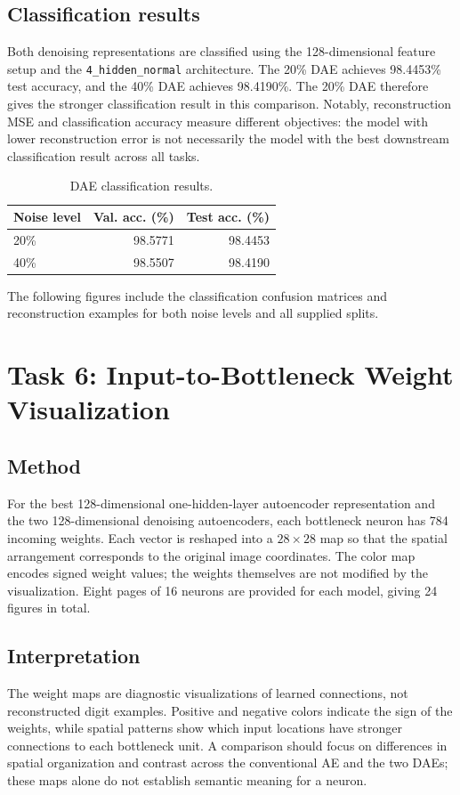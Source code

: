 \documentclass[conference,onecolumn]{IEEEtran}
\begin{document}
\subsection{Classification results}
Both denoising representations are classified using the 128-dimensional feature setup and the \texttt{4\_hidden\_normal} architecture. The 20\% DAE achieves 98.4453\% test accuracy, and the 40\% DAE achieves 98.4190\%. The 20\% DAE therefore gives the stronger classification result in this comparison. Notably, reconstruction MSE and classification accuracy measure different objectives: the model with lower reconstruction error is not necessarily the model with the best downstream classification result across all tasks.

\begin{table}[H]
\centering
\caption{DAE classification results.}
\label{tab:dae-cls}
\begin{tabular}{l r r}
\toprule
Noise level & Val. acc. (\%) & Test acc. (\%)\\
\midrule
20\% & 98.5771 & 98.4453\\
40\% & 98.5507 & 98.4190\\
\bottomrule
\end{tabular}
\end{table}

The following figures include the classification confusion matrices and reconstruction examples for both noise levels and all supplied splits.


\FloatBarrier

\section{Task 6: Input-to-Bottleneck Weight Visualization}
\subsection{Method}
For the best 128-dimensional one-hidden-layer autoencoder representation and the two 128-dimensional denoising autoencoders, each bottleneck neuron has 784 incoming weights. Each vector is reshaped into a $28\times28$ map so that the spatial arrangement corresponds to the original image coordinates. The color map encodes signed weight values; the weights themselves are not modified by the visualization. Eight pages of 16 neurons are provided for each model, giving 24 figures in total.

\subsection{Interpretation}
The weight maps are diagnostic visualizations of learned connections, not reconstructed digit examples. Positive and negative colors indicate the sign of the weights, while spatial patterns show which input locations have stronger connections to each bottleneck unit. A comparison should focus on differences in spatial organization and contrast across the conventional AE and the two DAEs; these maps alone do not establish semantic meaning for a neuron.
\end{document}
